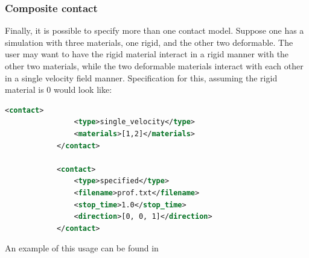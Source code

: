 \subsubsection{Composite contact}
Finally, it is possible to specify more than one contact model.  Suppose
one has a simulation with three materials, one rigid, and the other two
deformable.  The user may want to have the rigid material interact in a
rigid manner with the other two materials, while the two deformable materials
interact with each other in a single velocity field manner.  Specification
for this, assuming the rigid material is $0$ would look like:

\begin{lstlisting}[language=XML]
            <contact>
                <type>single_velocity</type>
                <materials>[1,2]</materials>
            </contact>

            <contact>
                <type>specified</type>
                <filename>prof.txt</filename>
                <stop_time>1.0</stop_time>
                <direction>[0, 0, 1]</direction>
            </contact>
\end{lstlisting}
An example of this usage can be found in 


